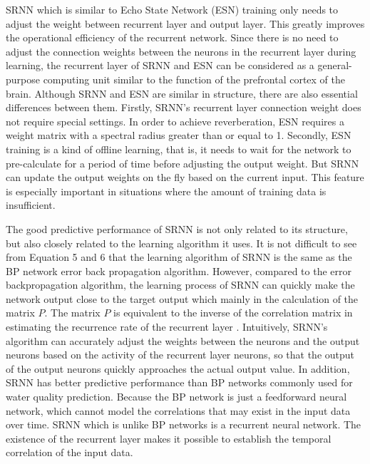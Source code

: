 \documentclass[runningheads]{llncs}
\begin{document}
SRNN which is similar to Echo State Network (ESN) training only needs 
to adjust the weight between recurrent layer and output layer. 
This greatly improves the operational efficiency of the recurrent network. 
Since there is no need to adjust the connection weights between the neurons 
in the recurrent layer during learning, the recurrent layer of SRNN 
and ESN can be considered as a general-purpose computing unit similar
 to the function of the prefrontal cortex of the brain\cite{RN20,RN21}. 
 Although SRNN and ESN are similar in structure, there are also essential 
 differences between them. Firstly, SRNN's recurrent layer connection 
 weight does not require special settings. In order to achieve 
 reverberation, ESN requires a weight matrix with a spectral radius 
 greater than or equal to 1. Secondly, ESN training is a kind of 
 offline learning, that is, it needs to wait for the network to 
 pre-calculate for a period of time before adjusting the output 
 weight. But SRNN can update the output weights on the fly based 
 on the current input. This feature is especially important 
 in situations where the amount of training data is insufficient. 

 The good predictive performance of SRNN is not only related to 
 its structure, but also closely related to the learning algorithm 
 it uses. It is not difficult to see from Equation 5 and 6 that the 
 learning algorithm of SRNN is the same as the BP network error 
 back propagation algorithm. However, compared to the error 
 backpropagation algorithm, the learning process of SRNN can 
 quickly make the network output close to the target output 
 which mainly in the calculation of the matrix $P$. The matrix $P$ 
 is equivalent to the inverse of the correlation matrix in 
 estimating the recurrence rate of the recurrent layer \cite{RN23}. 
 Intuitively, SRNN's algorithm can accurately adjust the weights 
 between the neurons and the output neurons based on the activity 
 of the recurrent layer neurons, so that the output of the 
 output neurons quickly approaches the actual output value. 
 In addition, SRNN has better predictive performance than BP 
 networks commonly used for water quality prediction. Because 
 the BP network is just a feedforward neural network, which 
 cannot model the correlations that may exist in the input data 
 over time. SRNN which is unlike BP networks is a recurrent neural 
 network. The existence of the recurrent layer makes it possible 
 to establish the temporal correlation of the input data. 
\end{document}
